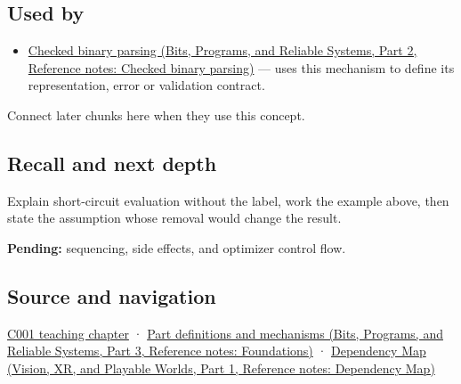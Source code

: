 \subsection{Used by}\label{appendix-2e245a6fa8d3-used-by}

\hypertarget{appendix-2e245a6fa8d3-used-by}{}

\begin{itemize}
\tightlist
\item
  \href{../01-Bits-Programs-and-Reliable-Systems-P02/main.pdf\#nameddest=appendix-652d81568de9}{Checked binary parsing (Bits, Programs, and Reliable Systems, Part 2, Reference notes: Checked binary parsing)} --- uses this mechanism to define its representation, error or validation contract.
\end{itemize}

Connect later chunks here when they use this concept.

\subsection{Recall and next depth}\label{appendix-2e245a6fa8d3-recall-and-next-depth}

\hypertarget{appendix-2e245a6fa8d3-recall-and-next-depth}{}

Explain short-circuit evaluation without the label, work the example above, then state the assumption whose removal would change the result.

\textbf{Pending:} sequencing, side effects, and optimizer control flow.

\subsection{Source and navigation}\label{appendix-2e245a6fa8d3-source-and-navigation}

\hypertarget{appendix-2e245a6fa8d3-source-and-navigation}{}

\hyperref[01-foundations-i-ch001-from-a-signal-to-an-interpretation]{C001 teaching chapter} · \href{../01-Bits-Programs-and-Reliable-Systems-P03/main.pdf\#nameddest=appendix-fd090d982a15}{Part definitions and mechanisms (Bits, Programs, and Reliable Systems, Part 3, Reference notes: Foundations)} · \href{../07-Vision-XR-and-Playable-Worlds-P01/main.pdf\#nameddest=appendix-4ad47bdd269a}{Dependency Map (Vision, XR, and Playable Worlds, Part 1, Reference notes: Dependency Map)}
